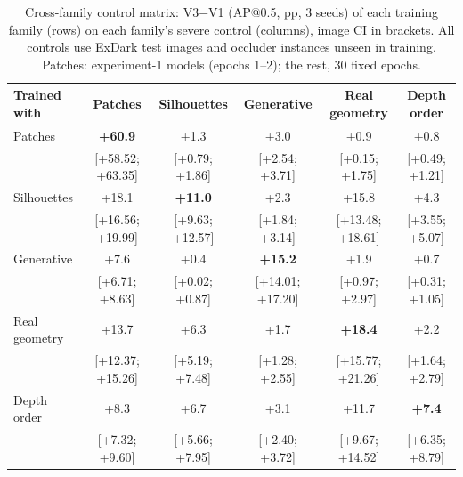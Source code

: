 \begin{table}[H]\centering\scriptsize
\caption{Cross-family control matrix: V3$-$V1 (AP@0.5, pp, 3 seeds) of each training family (rows) on each family's severe control (columns), image CI in brackets. All controls use ExDark test images and occluder instances unseen in training. Patches: experiment-1 models (epochs 1--2); the rest, 30 fixed epochs.}\label{tab:s-cruzada}
\setlength{\tabcolsep}{2pt}\begin{tabular}{@{}l ccccc@{}}\toprule
Trained with & Patches & Silhouettes & Generative & Real geometry & Depth order \\ \midrule
Patches & \textbf{+60.9} & +1.3 & +3.0 & +0.9 & +0.8 \\
 & {\tiny [+58.52; +63.35]} & {\tiny [+0.79; +1.86]} & {\tiny [+2.54; +3.71]} & {\tiny [+0.15; +1.75]} & {\tiny [+0.49; +1.21]} \\[2pt]
Silhouettes & +18.1 & \textbf{+11.0} & +2.3 & +15.8 & +4.3 \\
 & {\tiny [+16.56; +19.99]} & {\tiny [+9.63; +12.57]} & {\tiny [+1.84; +3.14]} & {\tiny [+13.48; +18.61]} & {\tiny [+3.55; +5.07]} \\[2pt]
Generative & +7.6 & +0.4 & \textbf{+15.2} & +1.9 & +0.7 \\
 & {\tiny [+6.71; +8.63]} & {\tiny [+0.02; +0.87]} & {\tiny [+14.01; +17.20]} & {\tiny [+0.97; +2.97]} & {\tiny [+0.31; +1.05]} \\[2pt]
Real geometry & +13.7 & +6.3 & +1.7 & \textbf{+18.4} & +2.2 \\
 & {\tiny [+12.37; +15.26]} & {\tiny [+5.19; +7.48]} & {\tiny [+1.28; +2.55]} & {\tiny [+15.77; +21.26]} & {\tiny [+1.64; +2.79]} \\[2pt]
Depth order & +8.3 & +6.7 & +3.1 & +11.7 & \textbf{+7.4} \\
 & {\tiny [+7.32; +9.60]} & {\tiny [+5.66; +7.95]} & {\tiny [+2.40; +3.72]} & {\tiny [+9.67; +14.52]} & {\tiny [+6.35; +8.79]} \\[2pt]
\bottomrule\end{tabular}\end{table}
